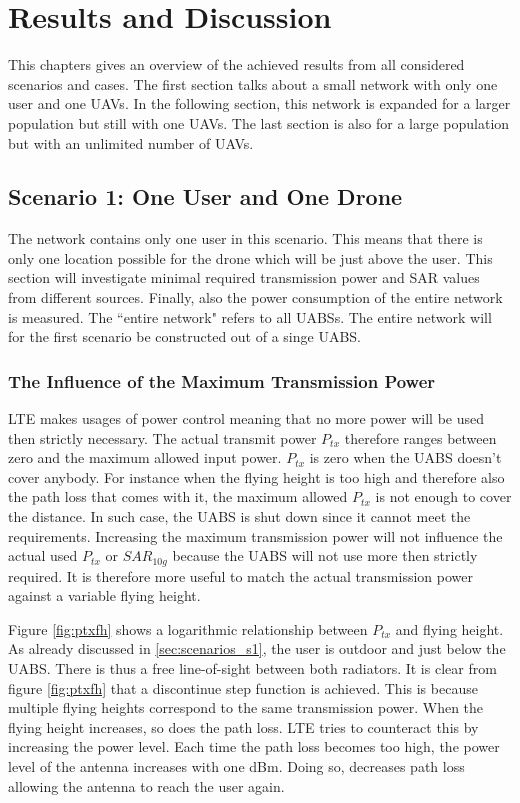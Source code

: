 \chapter{Results and Discussion}
\label{chap:results}

This chapters gives an overview of the achieved results from all considered scenarios and cases.
The first section talks about a small network with only one user and one \gls{UAV}s. In 
the following section, this network is expanded for a larger population but still with one \gls{UAV}s.
The last section is also for a large population but with an unlimited number of \gls{UAV}s.

\section{Scenario 1: One User and One Drone}
The network contains only one user in this scenario. This means that there is only one location possible for the drone which will 
be just above 
the user. This section will investigate minimal required transmission power and SAR values from different sources.
Finally, also the power consumption of the entire network is measured. The  ``entire network" refers to all \gls{UABS}s. The entire network 
will for the first scenario be constructed out of a singe \gls{UABS}.

\subsection{The Influence of the Maximum Transmission Power}
\label{s1a}
\gls{LTE} makes usages of power control meaning that no more power will be used then strictly necessary. The actual 
transmit power $P_{tx}$ therefore ranges between zero and the maximum allowed input power. $P_{tx}$ is zero when the \gls{UABS} doesn't cover anybody.
For instance when the flying height is too high and therefore also the path loss that comes with it, the maximum allowed $P_{tx}$ is not enough to cover 
the distance. In such case, the \gls{UABS} is shut down since it cannot meet the requirements.
Increasing the maximum transmission power will not influence the actual used $P_{tx}$ or $SAR_{10g}$ because the \gls{UABS} will not use more
then strictly required. It is therefore more useful to match the actual transmission power against a variable flying height. 

Figure \ref{fig:ptxfh} shows a logarithmic relationship between $P_{tx}$ and flying height.
As already discussed in \ref{sec:scenarios_s1}, the user is outdoor and just below the \gls{UABS}. There is thus a free line-of-sight between both
radiators. It is clear  from figure \ref{fig:ptxfh} that a discontinue step function is achieved. This is because multiple flying heights correspond to the same transmission power.
When the flying height increases, so does the path loss. \gls{LTE} tries to counteract this by increasing the power level. Each time 
the path loss becomes too high, the power level of the antenna increases with one dBm. Doing so, decreases path loss allowing the antenna to reach
the user again. 

